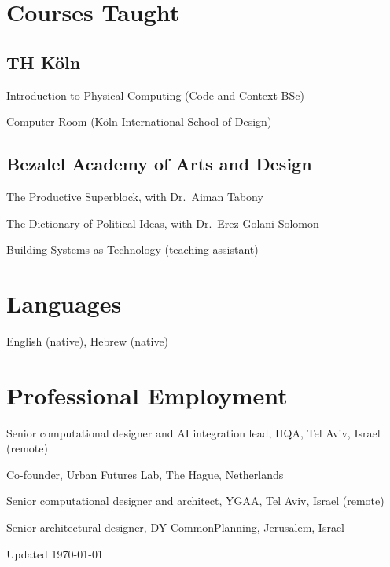 \documentclass[11pt,letterpaper]{report} %
\newcommand{\listitemspace}{0.25em}
\renewenvironment{itemize}
{
  \begin{list}{}{\setlength{\leftmargin}{0em}
      \setlength{\parskip}{0em}
      \setlength{\itemsep}{\listitemspace}
  \setlength{\parsep}{\listitemspace}}}
  {
\end{list}}
\begin{document}
\section*{Courses Taught}

\subsection*{TH Köln}

\begin{itemize}

  \item Introduction to Physical Computing (Code and Context BSc)
  \item Computer Room (Köln International School of Design)

\end{itemize}

\subsection*{Bezalel Academy of Arts and Design}

\begin{itemize}

  \item The Productive Superblock, with Dr.\ Aiman Tabony
  \item The Dictionary of Political Ideas, with Dr.\ Erez Golani Solomon
  \item Building Systems as Technology (teaching assistant)

\end{itemize}

\section*{Languages}

\begin{itemize}

  \item English (native), Hebrew (native)

\end{itemize}

\section*{Professional Employment}

\begin{tablist}

\item[2026--]   \tab{}Senior computational designer and AI integration lead, HQA, Tel Aviv, Israel (remote)
\item[2024--]   \tab{}Co-founder, Urban Futures Lab, The Hague, Netherlands
\item[2022--25] \tab{}Senior computational designer and architect, YGAA, Tel Aviv, Israel (remote)
\item[2018--21] \tab{}Senior architectural designer, DY-CommonPlanning, Jerusalem, Israel

\end{tablist}

\begin{center}
  \vfill
  Updated \monthyeardate\today
\end{center}
\end{document}
